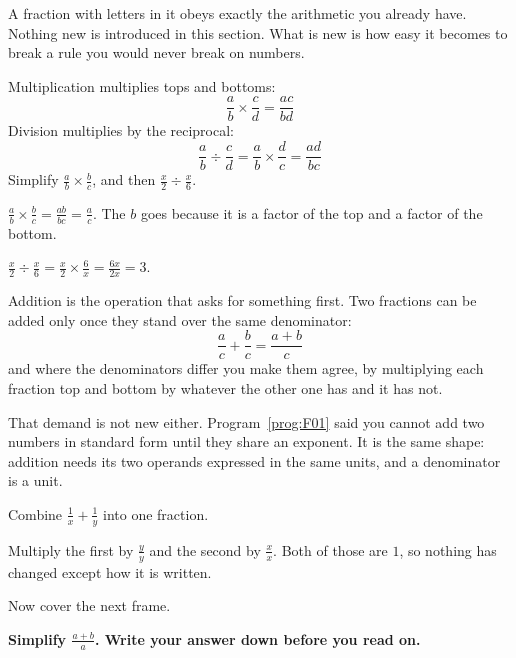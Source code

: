 \begin{fr}
A fraction with letters in it obeys exactly the arithmetic you already have.
Nothing new is introduced in this section. What is new is how easy it becomes
to break a rule you would never break on numbers.

Multiplication multiplies tops and bottoms:
\[ \frac{a}{b} \times \frac{c}{d} = \frac{ac}{bd} \]
Division multiplies by the reciprocal:
\[ \frac{a}{b} \div \frac{c}{d} = \frac{a}{b} \times \frac{d}{c}
   = \frac{ad}{bc} \]
Simplify $\frac{a}{b} \times \frac{b}{c}$, and then
$\frac{x}{2} \div \frac{x}{6}$.
\dotline
\nextframe
\end{fr}

\begin{fr}
\begin{ansblock}
$\frac{a}{b} \times \frac{b}{c} = \frac{ab}{bc} = \frac{a}{c}$. The $b$
goes because it is a factor of the top and a factor of the bottom.

$\frac{x}{2} \div \frac{x}{6} = \frac{x}{2} \times \frac{6}{x}
= \frac{6x}{2x} = 3$.
\end{ansblock}

Addition is the operation that asks for something first. Two fractions can be
added only once they stand over the same denominator:
\[ \frac{a}{c} + \frac{b}{c} = \frac{a + b}{c} \]
and where the denominators differ you make them agree, by multiplying each
fraction top and bottom by whatever the other one has and it has not.

That demand is not new either. Program~\ref{prog:F01} said you cannot add two
numbers in standard form until they share an exponent. It is the same shape:
addition needs its two operands expressed in the same units, and a denominator
is a unit.

Combine $\frac{1}{x} + \frac{1}{y}$ into one fraction.
\nextframe
\end{fr}

\begin{fr}
Multiply the first by $\frac{y}{y}$ and the second by $\frac{x}{x}$. Both of
those are $1$, so nothing has changed except how it is written.

Now cover the next frame.

\textbf{Simplify $\frac{a + b}{a}$. Write your answer down before you read
on.}
\dotline
\nextframe
\end{fr}

